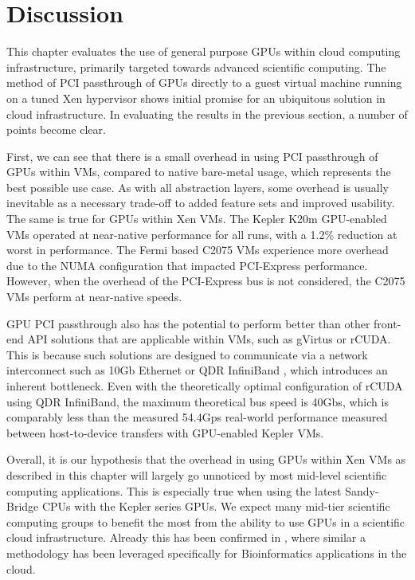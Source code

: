 \section{Discussion}

This chapter evaluates the use of general purpose GPUs within cloud computing infrastructure, primarily targeted towards advanced scientific computing. The method of PCI passthrough of GPUs directly to a guest virtual machine running on a tuned Xen hypervisor shows initial promise for an ubiquitous solution in cloud infrastructure. In evaluating the results in the previous section, a number of points become clear. 

First, we can see that there is a small overhead in using PCI passthrough of GPUs within VMs, compared to native bare-metal usage, which represents the best possible use case. As with all abstraction layers, some overhead is usually inevitable as a necessary trade-off to added feature sets and improved usability. The same is true for GPUs within Xen VMs.  The Kepler K20m GPU-enabled VMs operated at near-native performance for all runs, with a 1.2\% reduction at worst in performance. The Fermi based C2075 VMs experience more overhead due to the NUMA configuration that impacted PCI-Express performance. However, when the overhead of the PCI-Express bus is not considered, the C2075 VMs perform at near-native speeds. %

GPU PCI passthrough also has the potential to perform better than other front-end API solutions that are applicable within VMs, such as gVirtus or rCUDA. This is because such solutions are designed to communicate via a network interconnect such as 10Gb Ethernet or QDR InfiniBand  \cite{rCUDAMellanox}, which introduces an inherent bottleneck. Even with the theoretically optimal configuration of rCUDA using QDR InfiniBand, the maximum theoretical bus speed is 40Gbs, which is comparably less than the measured 54.4Gps real-world performance measured between host-to-device transfers with  GPU-enabled Kepler VMs.  


Overall, it is our hypothesis that the overhead in using GPUs within Xen VMs as described in this chapter will largely go unnoticed by most mid-level scientific computing applications.  This is especially true when using the latest Sandy-Bridge CPUs with the Kepler series GPUs.  We expect many mid-tier scientific computing groups to benefit the most from the ability to use GPUs in a scientific cloud infrastructure. Already this has been confirmed in \cite{jo2013exploiting}, where similar a methodology has been leveraged specifically for Bioinformatics applications in the cloud. 


